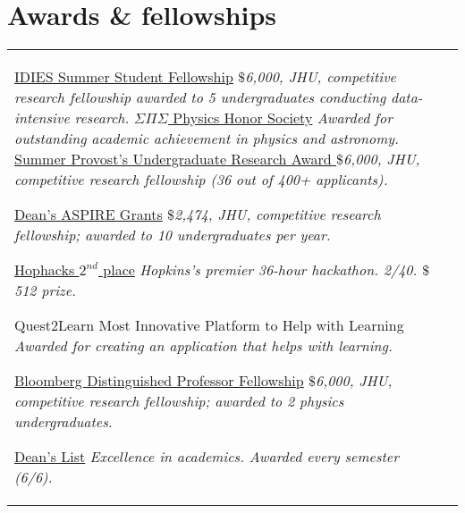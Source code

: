 \documentclass[10pt]{article} %
\begin{document}
\section{Awards \& fellowships}





	
\begin{supertabular}{L{4cm}@{\hskip 0.3in}L{13cm}}
{\href{https://www.idies.jhu.edu/what-we-offer/funding/idies-summer-student-fellowship/}{IDIES Summer Student Fellowship}} %
{\textit{$\$$6,000, JHU, competitive research fellowship awarded to 5 undergraduates conducting data-intensive research.}}
{\href{https://www.sigmapisigma.org/sigmapisigma}{$\Sigma\Pi\Sigma$ Physics Honor Society}} %
{\textit{Awarded for outstanding academic achievement in physics and astronomy.}}
{\href{https://hour.jhu.edu/opportunities/summerpura/}{Summer Provost’s Undergraduate Research Award }} %
{\textit{$\$$6,000, JHU, competitive research fellowship (36 out of 400+ applicants).}} %

{\href{https://krieger.jhu.edu/ursca/projects/aspire-grant/}{Dean's ASPIRE Grants}} %
{\textit{$\$$2,474, JHU, competitive research fellowship; awarded to 10 undergraduates per year.}} %

{\href{https://hophacks.com/}{Hophacks $2^{nd}$ place}} %
{\textit{Hopkins's premier 36-hour hackathon. 2/40. $\$$512 prize.}} %

{Quest2Learn Most Innovative Platform to Help with Learning }
{\textit{Awarded for creating an application that helps with learning.}}


{\href{https://hour.jhu.edu/opportunities/bdpsp/}{Bloomberg Distinguished Professor Fellowship}}
{\textit{$\$$6,000, JHU, competitive research fellowship; awarded to 2 physics undergraduates.}}

{\href{https://advising.jhu.edu/student-roadmap/seniors/honors/}{Dean's List}}
{\textit{Excellence in academics. Awarded every semester (6/6).}}
\end{supertabular}
\end{document}
